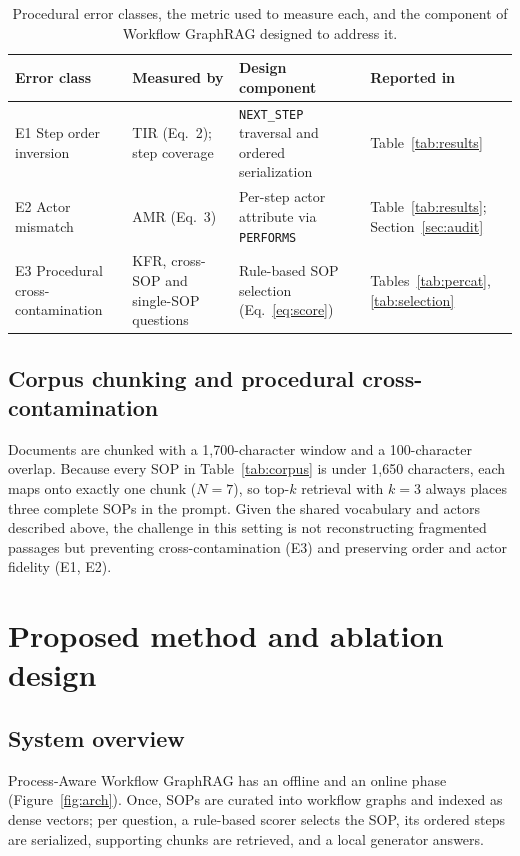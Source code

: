 \documentclass[preprint,10pt]{elsarticle}
\begin{document}
\begin{table}[!htbp]
\centering
\caption{Procedural error classes, the metric used to measure each, and the component of Workflow GraphRAG designed to address it.}
\label{tab:errormap}
\small
\setlength{\tabcolsep}{4pt}
\begin{tabularx}{\textwidth}{>{\raggedright\arraybackslash}p{2.2cm} >{\raggedright\arraybackslash}X >{\raggedright\arraybackslash}p{3.0cm} >{\raggedright\arraybackslash}p{2.0cm}}
\toprule
Error class & Measured by & Design component & Reported in \\
\midrule
E1 Step order inversion & TIR (Eq.~2); step coverage & \texttt{NEXT\_STEP} traversal and ordered serialization & Table~\ref{tab:results} \\
E2 Actor mismatch & AMR (Eq.~3) & Per-step actor attribute via \texttt{PERFORMS} & Table~\ref{tab:results}; Section~\ref{sec:audit} \\
E3 Procedural cross-contamination & KFR, cross-SOP and single-SOP questions & Rule-based SOP selection (Eq.~\eqref{eq:score}) & Tables~\ref{tab:percat}, \ref{tab:selection} \\
\bottomrule
\end{tabularx}
\end{table}

\subsection{Corpus chunking and procedural cross-contamination}
Documents are chunked with a 1,700-character window and a 100-character overlap. Because every SOP in Table~\ref{tab:corpus} is under 1,650 characters, each maps onto exactly one chunk ($N=7$), so top-$k$ retrieval with $k=3$ always places three complete SOPs in the prompt. Given the shared vocabulary and actors described above, the challenge in this setting is not reconstructing fragmented passages but preventing cross-contamination (E3) and preserving order and actor fidelity (E1, E2).

\section{Proposed method and ablation design}
\label{sec:method}

\subsection{System overview}
Process-Aware Workflow GraphRAG has an offline and an online phase (Figure~\ref{fig:arch}). Once, SOPs are curated into workflow graphs and indexed as dense vectors; per question, a rule-based scorer selects the SOP, its ordered steps are serialized, supporting chunks are retrieved, and a local generator answers.
\end{document}
